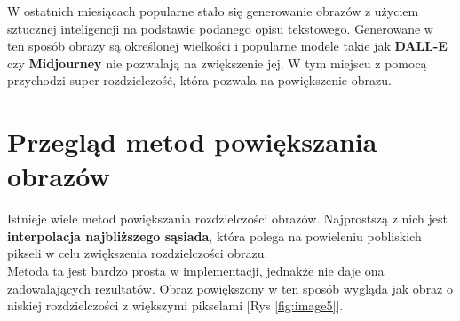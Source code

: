 W ostatnich miesiącach popularne stało się generowanie obrazów z użyciem sztucznej inteligencji na podstawie podanego opisu tekstowego. Generowane w ten sposób obrazy są określonej wielkości i popularne modele takie jak \textbf{DALL-E} czy \textbf{Midjourney} nie pozwalają na zwiększenie jej. W tym miejscu z pomocą przychodzi super-rozdzielczość, która pozwala na powiększenie obrazu.



\section{Przegląd metod powiększania obrazów}


Istnieje wiele metod powiększania rozdzielczości obrazów. Najprostszą z nich jest \textbf{interpolacja najbliższego sąsiada}, która polega na powieleniu pobliskich pikseli w celu zwiększenia rozdzielczości obrazu. \\
Metoda ta jest bardzo prosta w implementacji, jednakże nie daje ona zadowalających rezultatów. Obraz powiększony w ten sposób wygląda jak obraz o niskiej rozdzielczości z większymi pikselami [Rys \ref{fig:image5}]. 

